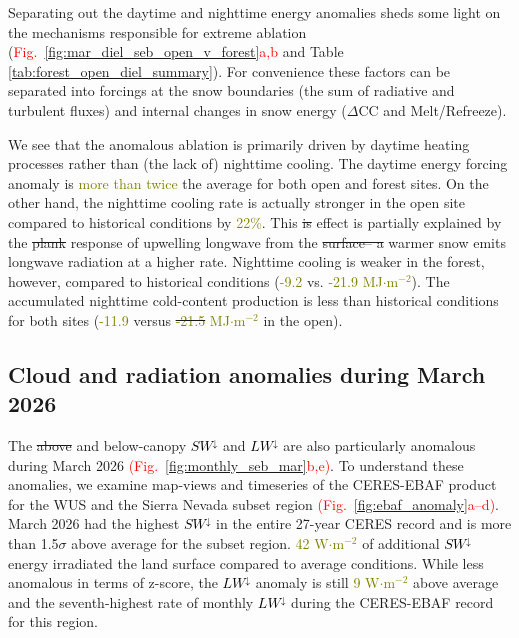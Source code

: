 \documentclass[draft]{agujournal2019}
\newcommand{\fig}[2]{\textcolor{red}{(Fig.~\ref{#1}{#2})}}   %
\newcommand{\fignop}[2]{\textcolor{red}{Fig.~\ref{#1}{#2}}}  %
\newcommand{\mynum}[1]{\textcolor{olive}{#1}}
\newcommand{\lwdn}{\textcolor{black}{$LW^{\downarrow}$}\xspace}
\newcommand{\swdn}{\textcolor{black}{$SW^{\downarrow}$}\xspace}
\newcommand{\wmsq}{\textcolor{olive}{W$\cdot$m$^{-2}$}\xspace}
\newcommand{\mjmtwo}{\textcolor{olive}{MJ$\cdot$m$^{-2}$}\xspace}
\providecommand{\DIFadd}[1]{{\protect\color{blue}\uwave{#1}}} %
\providecommand{\DIFdel}[1]{{\protect\color{red}\sout{#1}}}                      %
\providecommand{\DIFaddbegin}{} %
\providecommand{\DIFaddend}{} %
\providecommand{\DIFdelbegin}{} %
\providecommand{\DIFdelend}{} %
\begin{document}
Separating out the daytime and nighttime energy anomalies sheds some light on the mechanisms responsible for extreme ablation (\fignop{fig:mar_diel_seb_open_v_forest}{a,b} and Table \ref{tab:forest_open_diel_summary}).
For convenience these factors can be separated into forcings at the snow boundaries (the sum of radiative and turbulent fluxes) and internal changes in snow energy ($\Delta$CC and Melt/Refreeze).

We see that the anomalous ablation is primarily driven by daytime heating processes rather than (the lack of) nighttime cooling.
The daytime energy forcing anomaly is \mynum{more than twice} the average for both open and forest sites. 
On the other hand, the nighttime cooling rate is actually stronger in the open site compared to historical conditions by \mynum{22\%}.
This \DIFdelbegin \DIFdel{is }\DIFdelend effect is partially explained by the \DIFdelbegin \DIFdel{plank }\DIFdelend \DIFaddbegin \DIFadd{Planck }\DIFaddend response of upwelling longwave from the \DIFdelbegin \DIFdel{surface-- a }\DIFdelend \DIFaddbegin \DIFadd{surface --- }\DIFaddend warmer snow emits longwave radiation at a higher rate.  
Nighttime cooling is weaker in the forest, however, compared to historical conditions (\mynum{-9.2} vs. \mynum{-21.9} \mjmtwo).
The accumulated nighttime cold-content production is less than historical conditions for both sites (\mynum{-11.9} versus \DIFdelbegin \DIFdel{\mynum{-21.5} }\DIFdelend \DIFaddbegin \DIFadd{\mynum{-19.5} }\DIFaddend \mjmtwo in the open). 



\subsection{Cloud and radiation anomalies during March 2026}\label{sec:results_ceres_ebaf}

The \DIFdelbegin \DIFdel{above }\DIFdelend \DIFaddbegin \DIFadd{above- }\DIFaddend and below-canopy \swdn and \lwdn are also particularly anomalous during March 2026 \fig{fig:monthly_seb_mar}{b,e}.
To understand these anomalies, we examine map-views and timeseries of the CERES-EBAF product for the WUS and the Sierra Nevada subset region \fig{fig:ebaf_anomaly}{a--d}.
March 2026 had the highest \swdn in the entire 27-year CERES record and is more than 1.5\DIFaddbegin \DIFadd{-}\DIFaddend $\sigma$ above average for the subset region.
\mynum{42} \wmsq of additional \swdn energy irradiated the land surface compared to average conditions.
While less anomalous in terms of z-score, the \lwdn anomaly is still \mynum{9} \wmsq above average and the seventh-highest rate of monthly \lwdn during the CERES-EBAF record for this region.
\end{document}
